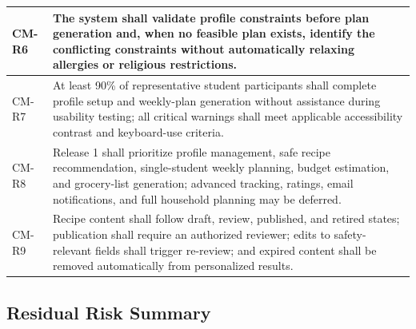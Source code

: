 \documentclass[11pt,a4paper]{article}
\begin{document}
\begin{center}
\begin{longtable}{|p{2.2cm}|p{13.8cm}|}
CM-R6 & The system shall validate profile constraints before plan generation and, when no feasible plan exists, identify the conflicting constraints without automatically relaxing allergies or religious restrictions. \\ \hline
CM-R7 & At least 90\% of representative student participants shall complete profile setup and weekly-plan generation without assistance during usability testing; all critical warnings shall meet applicable accessibility contrast and keyboard-use criteria. \\ \hline
CM-R8 & Release 1 shall prioritize profile management, safe recipe recommendation, single-student weekly planning, budget estimation, and grocery-list generation; advanced tracking, ratings, email notifications, and full household planning may be deferred. \\ \hline
CM-R9 & Recipe content shall follow draft, review, published, and retired states; publication shall require an authorized reviewer; edits to safety-relevant fields shall trigger re-review; and expired content shall be removed automatically from personalized results. \\ \hline
\end{longtable}
\end{center}

\subsection{Residual Risk Summary}
\end{document}
